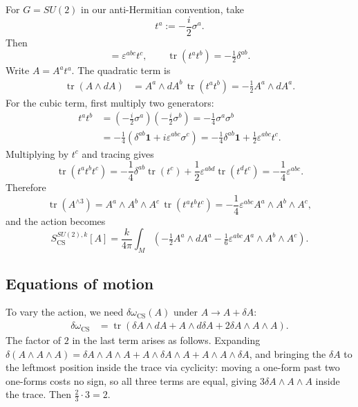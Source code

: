 \documentclass[11pt]{article}
\newcommand{\tr}{\operatorname{tr}}
\newcommand{\CS}{\operatorname{CS}}
\theoremstyle{definition}
\numberwithin{theorem}{section}
\numberwithin{equation}{section}
\begin{document}
\begin{example}\label{ex:SU2-action}
For $G = SU(2)$ in our anti-Hermitian convention, take
\begin{equation*}
t^a := -\frac{i}{2}\sigma^a.
\end{equation*}
Then
\begin{equation*}
[t^a,t^b] = \varepsilon^{abc}t^c,
\qquad
\tr(t^at^b) = -\tfrac{1}{2}\delta^{ab}.
\end{equation*}
Write $A = A^at^a$. The quadratic term is
\begin{align*}
\tr(A\wedge dA) &= A^a\wedge dA^b\,\tr(t^at^b) = -\tfrac{1}{2}A^a\wedge dA^a.
\end{align*}
\noindent For the cubic term, first multiply two generators:
\begin{equation*}
\begin{aligned}
t^at^b
&= \left(-\frac{i}{2}\sigma^a\right)\left(-\frac{i}{2}\sigma^b\right)
 = -\frac{1}{4}\sigma^a\sigma^b \\
&= -\frac{1}{4}\left(\delta^{ab}\mathbf{1} + i\varepsilon^{abc}\sigma^c\right)
 = -\frac{1}{4}\delta^{ab}\mathbf{1} + \frac{1}{2}\varepsilon^{abc}t^c.
\end{aligned}
\end{equation*}
\noindent Multiplying by $t^c$ and tracing gives
\begin{equation*}
\tr(t^at^bt^c)
= -\frac{1}{4}\delta^{ab}\tr(t^c) + \frac{1}{2}\varepsilon^{abd}\tr(t^dt^c)
= -\frac{1}{4}\varepsilon^{abc}.
\end{equation*}
Therefore
\begin{equation*}
\tr(A^{\wedge 3})
= A^a\wedge A^b\wedge A^c\,\tr(t^at^bt^c)
= -\frac{1}{4}\varepsilon^{abc}A^a\wedge A^b\wedge A^c,
\end{equation*}
and the action becomes
\begin{equation*}
S_{\CS}^{SU(2),k}[A] = \frac{k}{4\pi}\int_M\left(-\tfrac{1}{2}A^a\wedge dA^a - \tfrac{1}{6}\varepsilon^{abc}A^a\wedge A^b\wedge A^c\right).
\end{equation*}
\end{example}

\subsection{Equations of motion}

To vary the action, we need $\delta \omega_{\CS}(A)$ under $A\to A + \delta A$:
\begin{align*}
\delta \omega_{\CS} &= \tr\left(\delta A\wedge dA + A\wedge d\delta A + 2\delta A\wedge A\wedge A\right).
\end{align*}
The factor of $2$ in the last term arises as follows. Expanding $\delta(A\wedge A\wedge A) = \delta A\wedge A\wedge A + A\wedge \delta A\wedge A + A\wedge A\wedge \delta A$, and bringing the $\delta A$ to the leftmost position inside the trace via cyclicity: moving a one-form past two one-forms costs no sign, so all three terms are equal, giving $3\delta A\wedge A\wedge A$ inside the trace. Then $\tfrac{2}{3}\cdot 3 = 2$.
\end{document}
